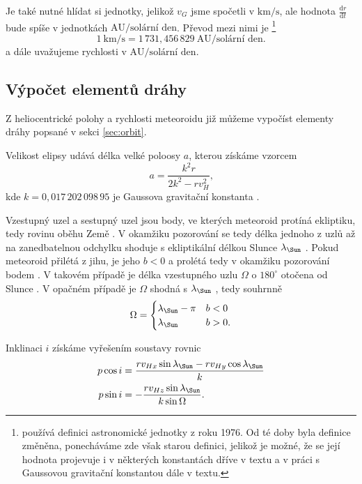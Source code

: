 Je také nutné hlídat si jednotky, jelikož $v_G$ jsme spočetli v $\text{km/s}$, ale hodnota $\frac{\text{d}r}{\text{d}t}$ bude spíše v jednotkách $\text{AU/solární den}$. Převod mezi nimi je \cite{ceplecha}\footnote{\cite{ceplecha} používá definici astronomické jednotky z roku 1976. Od té doby byla definice změněna, ponecháváme zde však starou definici, jelikož je možné, že se její hodnota projevuje i v některých konstantách dříve v textu a v práci s Gaussovou gravitační konstantou dále v textu.}
$$
    1\:\text{km/s}=1\,731{,}456\,829\:\text{AU/solární den.}
$$
a dále uvažujeme rychlosti v $\text{AU/solární den}$.

\subsection{Výpočet elementů dráhy}%
Z heliocentrické polohy a rychlosti meteoroidu již můžeme vypočíst elementy dráhy popsané v sekci \ref{sec:orbit}.

\smallskip

Velikost elipsy udává délka velké poloosy $a$, kterou získáme vzorcem \cite{ceplecha}
\begin{equation}
    a=\frac{k^2 r}{2k^2-r v_H^2}\text{,}
\end{equation}
kde $k=0{,}017\,202\,098\,95$ je Gaussova gravitační konstanta \cite{ceplecha}.

Vzestupný uzel {\NorthNode} a sestupný uzel {\SouthNode}  jsou body, ve kterých meteoroid protíná ekliptiku, tedy rovinu oběhu Země \cite{astro}. V okamžiku pozorování se tedy délka jednoho z uzlů až na zanedbatelnou odchylku shoduje s ekliptikální délkou Slunce $\lambda_\text{\Sun}$ \cite{ceplecha}. Pokud meteoroid přilétá z jihu, je jeho $b < 0$ a prolétá tedy v okamžiku pozorování bodem {\NorthNode}. V takovém případě je délka vzestupného uzlu $\Omega$ o $180^\circ$ otočena od Slunce \cite{ceplecha}. V opačném případě je $\Omega$ shodná s $\lambda_\text{\Sun}$ \cite{ceplecha}, tedy souhrnně
\begin{equation}
    \Omega=\begin{cases}
        \lambda_\text{\Sun}-\pi & b<0 \\
        \lambda_\text{\Sun}     & b>0 \text{.}
    \end{cases}
\end{equation}

Inklinaci $i$ získáme vyřešením soustavy rovnic \cite{ceplecha}
\begin{equation}
    \begin{aligned}
        p\cos{i}&=\frac{rv_{Hx}\sin{\lambda_\text{\Sun}}-rv_{Hy}\cos{\lambda_\text{\Sun}}}{k}\\
        p\sin{i}&=-\frac{rv_{Hz}\sin{\lambda_\text{\Sun}}}{k\sin{\Omega}}\text{.}
    \end{aligned}
    \label{eqn:photo:inclination}
\end{equation}

